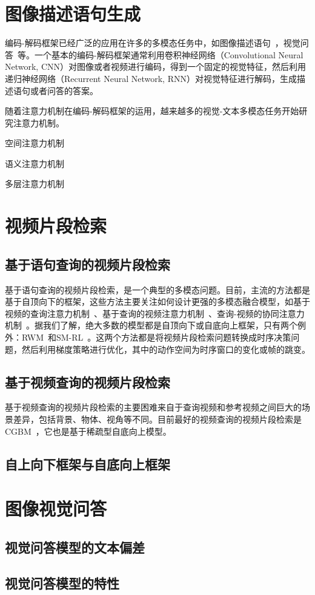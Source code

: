 \section{图像描述语句生成}
编码-解码框架已经广泛的应用在许多的多模态任务中，如图像描述语句~\cite{vinyals2015show,karpathy2015deep,donahue2015long,venugopalan2015sequence,venugopalan2014translating}，视觉问答~\cite{antol2015vqa,malinowski2015ask,gao2015you,ren2015exploring}等。一个基本的编码-解码框架通常利用卷积神经网络（Convolutional Neural Network, CNN）对图像或者视频进行编码，得到一个固定的视觉特征，然后利用递归神经网络（Recurrent Neural Network, RNN）对视觉特征进行解码，生成描述语句或者问答的答案。


随着注意力机制在编码-解码框架的运用，越来越多的视觉-文本多模态任务开始研究注意力机制。

空间注意力机制


语义注意力机制


多层注意力机制







\section{视频片段检索}

\subsection{基于语句查询的视频片段检索}
基于语句查询的视频片段检索，是一个典型的多模态问题。目前，主流的方法都是基于自顶向下的框架，这些方法主要关注如何设计更强的多模态融合模型，如基于视频的查询注意力机制~\cite{liu2018attentive}、基于查询的视频注意力机制~\cite{liu2018cross}、查询-视频的协同注意力机制~\cite{chen2018temporally,chen2019localizing,yuan2019find}。据我们了解，绝大多数的模型都是自顶向下或自底向上框架，只有两个例外：RWM~\cite{he2019read}和SM-RL~\cite{wang2019language}。这两个方法都是将视频片段检索问题转换成时序决策问题，然后利用梯度策略进行优化，其中的动作空间为时序窗口的变化或帧的跳变。


\subsection{基于视频查询的视频片段检索}
基于视频查询的视频片段检索的主要困难来自于查询视频和参考视频之间巨大的场景差异，包括背景、物体、视角等不同。目前最好的视频查询的视频片段检索是CGBM~\cite{feng2018video}，它也是基于稀疏型自底向上模型。


\subsection{自上向下框架与自底向上框架}







\section{图像视觉问答}


\subsection{视觉问答模型的文本偏差}


\subsection{视觉问答模型的特性}


